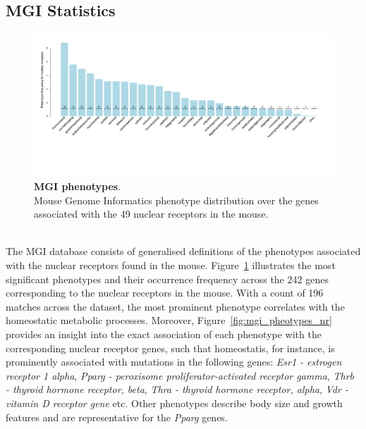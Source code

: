 \documentclass[fleqn,11pt]{SelfArx}
\begin{document}
\subsection{MGI Statistics}
\begin{figure}[H]
	\centering
	\includegraphics[width=\linewidth]{pics/mgi_phenotypes_distribution.pdf}
	\captionsetup{margin=12pt,format=plain,font=footnotesize,labelfont=bf}
 	\caption{\footnotesize{\textbf{MGI phenotypes}. 
	~~~~~~~\\
	Mouse Genome Informatics phenotype distribution over the genes associated with the 49 nuclear receptors in the mouse.}}
	\label{fig:mgi_pheotypes_distribution}
\end{figure}
~~~~~~~\\
The MGI database consists of generalised definitions of the phenotypes associated with the nuclear receptors found in the mouse. Figure~\ref{fig:mgi_pheotypes_distribution} illustrates the most significant phenotypes and their occurrence frequency across the 242 genes corresponding to the nuclear receptors in the mouse. With a count of 196 matches across the dataset, the most prominent phenotype correlates with the homeostatic metabolic processes. Moreover, Figure~\ref{fig:mgi_pheotypes_nr} provides an insight into the exact association of each phenotype with the corresponding nuclear receptor genes, such that homeostatis, for instance, is prominently associated with mutations in the following genes: \textit{Esr1 - estrogen receptor 1 alpha}, \textit{Pparg - peroxisome proliferator-activated receptor gamma}, \textit{Thrb - thyroid hormone receptor, beta}, \textit{Thra - thyroid hormone receptor, alpha}, \textit{Vdr - vitamin D receptor gene} etc. Other phenotypes describe body size and growth features and are representative for the \textit{Pparg} genes.
\end{document}

